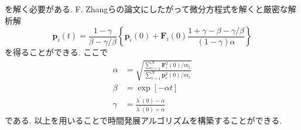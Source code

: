 を解く必要がある. 
F. Zhangらの論文にしたがって微分方程式を解くと厳密な解析解
\begin{equation}
    \bm{p}_{i}(t)
    =
    \frac{1 - \gamma}{\beta - \gamma / \beta}
    \left\{
        \bm{p}_{i}(0) + \bm{F}_{i}(0)
        \frac{1 + \gamma - \beta - \gamma/\beta}{(1 - \gamma)\alpha}
    \right\}
\end{equation}
を得ることができる. ここで
\begin{align}
    \alpha &=
    \sqrt
    {
        \frac
        {\sum_{i=1}^{N} \bm{F}_{i}^{2}(0) / m_{i}}
        {\sum_{i=1}^{N} \bm{p}_{i}^{2}(0) / m_{i}}
    }
    \\
    \beta &=
    \exp[-\alpha t]
    \\
    \gamma &=
    \frac{\lambda^{\prime}(0) - \alpha}{\lambda^{\prime}(0) + \alpha}
\end{align}
である. 以上を用いることで時間発展アルゴリズムを構築することができる.






